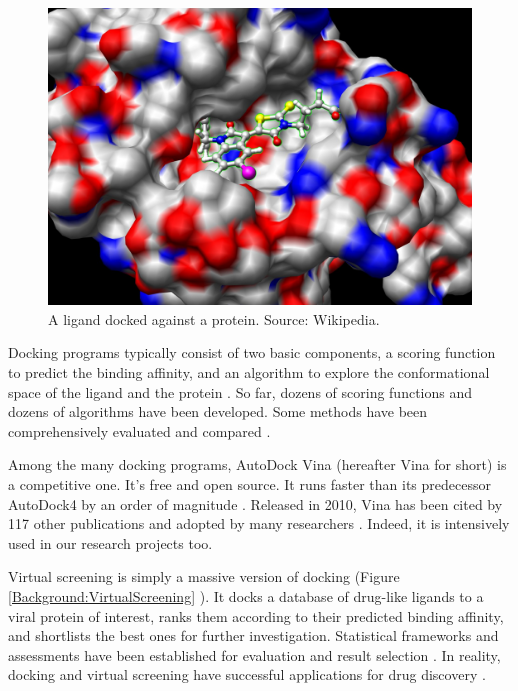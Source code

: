 \begin{figure}
\centering
\includegraphics[width=\textwidth]{Background/Docking.jpg}
\caption{A ligand docked against a protein. Source: Wikipedia.}
\label{Background:Docking}
\end{figure}

Docking programs typically consist of two basic components, a scoring function to predict the binding affinity, and an algorithm to explore the conformational space of the ligand and the protein \citep{493}. So far, dozens of scoring functions \citep{579,566,570,775,575,576,578,580,581,774} and dozens of algorithms \citep{595,564,594,602,603,604,605,606,607,781,614,615,617} have been developed. Some methods have been comprehensively evaluated and compared \citep{637,771,556}.

Among the many docking programs, AutoDock Vina \citep{595} (hereafter Vina for short) is a competitive one. It's free and open source. It runs faster than its predecessor AutoDock4 \citep{596} by an order of magnitude \citep{556}. Released in 2010, Vina has been cited by 117 other publications and adopted by many researchers \citep{609}. Indeed, it is intensively used in our research projects too.

Virtual screening is simply a massive version of docking (Figure \ref{Background:VirtualScreening} \citep{470}). It docks a database of drug-like ligands to a viral protein of interest, ranks them according to their predicted binding affinity, and shortlists the best ones for further investigation. Statistical frameworks and assessments have been established for evaluation and result selection \citep{489,491,769,583,582}. In reality, docking and virtual screening have successful applications for drug discovery \citep{495,498,751,503,752,757,506,738,761,763,766,736}.

